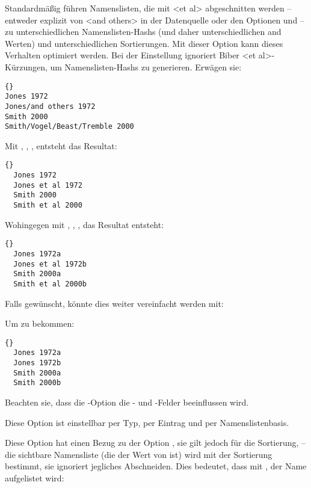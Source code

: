 \documentclass{ltxdockit}[2011/03/25]
\newcommand*{\biber}{Biber\xspace}
\begin{document}
\begin{optionlist}

Standardmäßig führen Namenslisten, die mit <et al> abgeschnitten werden --
 entweder explizit von <and others> in der Datenquelle oder den Optionen  und  -- zu unterschiedlichen Namenslisten-Hashs  (und daher unterschiedlichen  and  Werten) und unterschiedlichen Sortierungen. Mit dieser Option kann dieses Verhalten
 optimiert werden. Bei der Einstellung  ignoriert \biber 
 <et al>-Kürzungen, um Namenslisten-Hashs zu generieren. Erwägen sie:

\begin{lstlisting}{}
Jones 1972
Jones/and others 1972
Smith 2000
Smith/Vogel/Beast/Tremble 2000
\end{lstlisting}
%
Mit , , , entsteht das Resultat:

\begin{lstlisting}{}
  Jones 1972
  Jones et al 1972
  Smith 2000
  Smith et al 2000
\end{lstlisting}
%
Wohingegen mit , , , 
das Resultat entsteht:

\begin{lstlisting}{}
  Jones 1972a
  Jones et al 1972b
  Smith 2000a
  Smith et al 2000b
\end{lstlisting}

Falls gewünscht, könnte dies weiter vereinfacht werden mit:

\begin{ltxexample}
\end{ltxexample}
%
Um zu bekommen:

\begin{lstlisting}{}
  Jones 1972a
  Jones 1972b
  Smith 2000a
  Smith 2000b
\end{lstlisting}
%
Beachten sie, dass die -Option die  -  und
-Felder beeinflussen wird.

Diese Option ist einstellbar per Typ, per Eintrag und per Namenslistenbasis.


Diese Option hat einen Bezug zu der Option , sie gilt jedoch für die Sortierung, -- die sichtbare Namensliste (die der Wert von  ist) wird
mit der Sortierung bestimmt, sie ignoriert jegliches Abschneiden. Dies bedeutet, dass mit
, der Name aufgelistet wird:


\end{optionlist}
\end{document}

